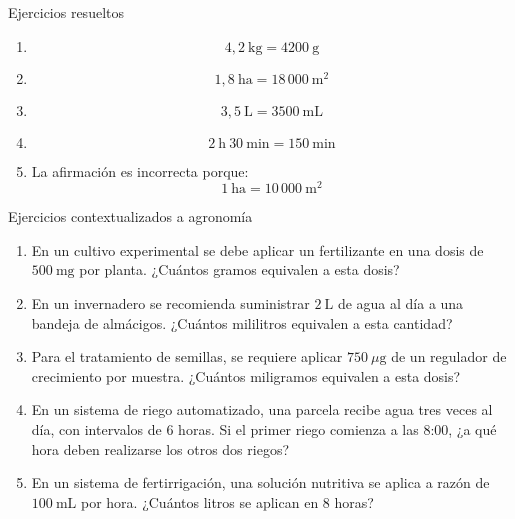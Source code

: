 \documentclass[handout,aspectratio=169,10pt]{beamer}
\begin{document}
	\begin{frame}{Ejercicios resueltos}
		\small
		\begin{enumerate}[<+->]
			\item \[
			4{,}2\ \text{kg} = 4200\ \text{g}
			\]
			
			\item \[
			1{,}8\ \text{ha} = 18\,000\ \text{m}^2
			\]
			
			\item \[
			3{,}5\ \text{L} = 3500\ \text{mL}
			\]
			
			\item \[
			2\ \text{h}\ 30\ \text{min} = 150\ \text{min}
			\]
			
			\item La afirmación es incorrecta porque:
			\[
			1\ \text{ha} = 10\,000\ \text{m}^2
			\]
		\end{enumerate}
	\end{frame}
	
	\begin{frame}{Ejercicios contextualizados a agronomía}
		\small
		\begin{enumerate}[<+->]
			\item En un cultivo experimental se debe aplicar un fertilizante en una dosis de \(500\ \text{mg}\) por planta. ¿Cuántos gramos equivalen a esta dosis?
			\item En un invernadero se recomienda suministrar \(2\ \text{L}\) de agua al día a una bandeja de almácigos. ¿Cuántos mililitros equivalen a esta cantidad?
			\item Para el tratamiento de semillas, se requiere aplicar \(750\ \mu\text{g}\) de un regulador de crecimiento por muestra. ¿Cuántos miligramos equivalen a esta dosis?
			\item En un sistema de riego automatizado, una parcela recibe agua tres veces al día, con intervalos de 6 horas. Si el primer riego comienza a las 8:00, ¿a qué hora deben realizarse los otros dos riegos?
			\item En un sistema de fertirrigación, una solución nutritiva se aplica a razón de \(100\ \text{mL}\) por hora. ¿Cuántos litros se aplican en 8 horas?
		\end{enumerate}
	\end{frame}
	
\end{document}

